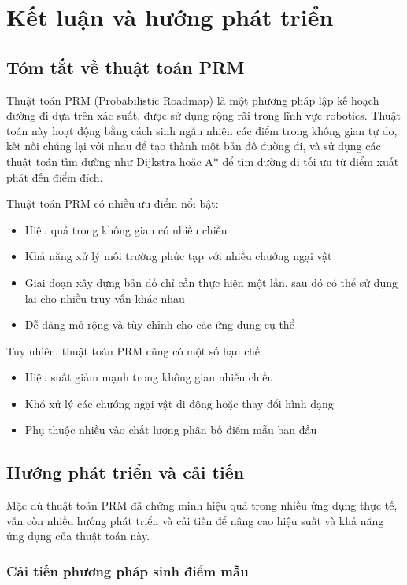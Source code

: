\documentclass[12pt,a4paper,openany,oneside]{report}
\begin{document}
\chapter{Kết luận và hướng phát triển}

\section{Tóm tắt về thuật toán PRM}

Thuật toán PRM (Probabilistic Roadmap) là một phương pháp lập kế hoạch đường đi dựa trên xác suất, được sử dụng rộng rãi trong lĩnh vực robotics. Thuật toán này hoạt động bằng cách sinh ngẫu nhiên các điểm trong không gian tự do, kết nối chúng lại với nhau để tạo thành một bản đồ đường đi, và sử dụng các thuật toán tìm đường như Dijkstra hoặc A* để tìm đường đi tối ưu từ điểm xuất phát đến điểm đích.

Thuật toán PRM có nhiều ưu điểm nổi bật:
\begin{itemize}
    \item Hiệu quả trong không gian có nhiều chiều
    \item Khả năng xử lý môi trường phức tạp với nhiều chướng ngại vật
    \item Giai đoạn xây dựng bản đồ chỉ cần thực hiện một lần, sau đó có thể sử dụng lại cho nhiều truy vấn khác nhau
    \item Dễ dàng mở rộng và tùy chỉnh cho các ứng dụng cụ thể
\end{itemize}

Tuy nhiên, thuật toán PRM cũng có một số hạn chế:
\begin{itemize}
    \item Hiệu suất giảm mạnh trong không gian nhiều chiều
    \item Khó xử lý các chướng ngại vật di động hoặc thay đổi hình dạng
    \item Phụ thuộc nhiều vào chất lượng phân bố điểm mẫu ban đầu
\end{itemize}

\section{Hướng phát triển và cải tiến}

Mặc dù thuật toán PRM đã chứng minh hiệu quả trong nhiều ứng dụng thực tế, vẫn còn nhiều hướng phát triển và cải tiến để nâng cao hiệu suất và khả năng ứng dụng của thuật toán này.

\subsection{Cải tiến phương pháp sinh điểm mẫu}
\end{document}
